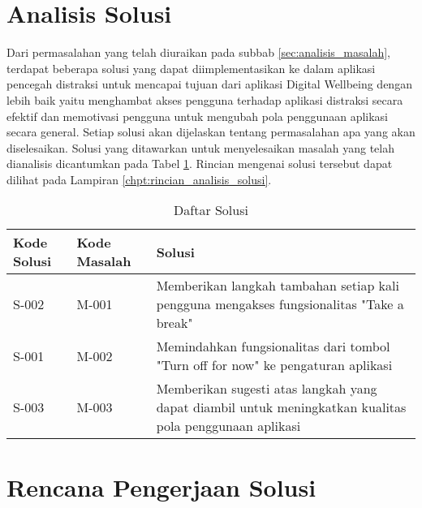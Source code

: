\section{Analisis Solusi}
\label{sec:analisis_solusi}

Dari permasalahan yang telah diuraikan pada subbab \ref{sec:analisis_masalah}, terdapat beberapa solusi yang dapat diimplementasikan ke dalam aplikasi pencegah distraksi untuk mencapai tujuan dari aplikasi Digital Wellbeing dengan lebih baik yaitu menghambat akses pengguna terhadap aplikasi distraksi secara efektif dan memotivasi pengguna untuk mengubah pola penggunaan aplikasi secara general. Setiap solusi akan dijelaskan tentang permasalahan apa yang akan diselesaikan. Solusi yang ditawarkan untuk menyelesaikan masalah yang telah dianalisis dicantumkan pada Tabel \ref{tab:daftar_solusi}. Rincian mengenai solusi tersebut dapat dilihat pada Lampiran \ref{chpt:rincian_analisis_solusi}.


\begin{table}[h]
  \centering
  \fontsize{10}{12}
  \caption{Daftar Solusi}
  \label{tab:daftar_solusi}
  \vspace{0.2cm}
  \begin{tabular}{|p{}|p{}|p{}|}
  \hline
  Kode Solusi & Kode Masalah & Solusi \\ \hline
  S-002 & M-001 & Memberikan langkah tambahan setiap kali pengguna mengakses fungsionalitas "Take a break" \\ \hline
  S-001 & M-002 & Memindahkan fungsionalitas dari tombol "Turn off for now" ke pengaturan aplikasi \\ \hline
  S-003 & M-003 & Memberikan sugesti atas langkah yang dapat diambil untuk meningkatkan kualitas pola penggunaan aplikasi \\ \hline
  \end{tabular}
\end{table}




\section{Rencana Pengerjaan Solusi}



